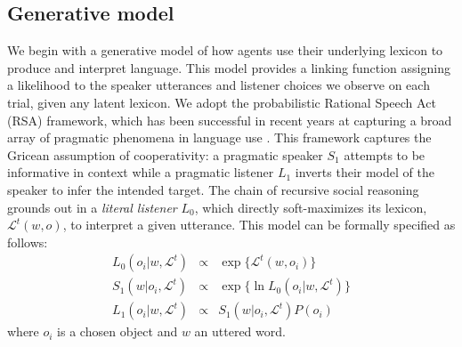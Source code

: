 \subsection{Generative model}

We begin with a generative model of how agents use their underlying lexicon to produce and interpret language. 
This model provides a linking function assigning a likelihood to the speaker utterances and listener choices we observe on each trial, given any latent lexicon. 
We adopt the probabilistic Rational Speech Act (RSA) framework, which has been successful in recent years at capturing a broad array of pragmatic phenomena in language use \cite{GoodmanFrank16_RSATiCS,FrankeJager16_ProbabilisticPragmatics}.
This framework captures the Gricean assumption of cooperativity: a pragmatic speaker $S_1$ attempts to be informative in context while a pragmatic listener $L_1$ inverts their model of the speaker to infer the intended target. 
The chain of recursive social reasoning grounds out in a \emph{literal listener} $L_0$, which directly soft-maximizes its lexicon, $\mathcal{L}^t(w,o)$, to interpret a given utterance. 
This model can be formally specified as follows:
$$
\begin{array}{rcl}
L_0(o_i | w, \mathcal{L}^t) &\propto  & \exp\{\mathcal{L}^t(w,o_i)\} \\
S_1(w | o_i, \mathcal{L}^t) &\propto & \exp\{\ln L_0(o_i | w, \mathcal{L}^t)\} \\
L_1(o_i | w, \mathcal{L}^t) &\propto  & S_1(w | o_i, \mathcal{L}^t) P(o_i) 
\end{array}
$$
where $o_i$ is a chosen object and $w$ an uttered word.

